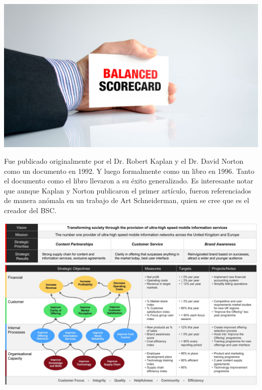 \begin{center}
\includegraphics[width=15cm]{./Imagenes/img3}
\end{center}

\item{Fue publicado originalmente por el Dr. Robert Kaplan y el Dr. David Norton como un documento en 1992. Y luego formalmente como un libro en 1996. Tanto el documento como el libro llevaron a su éxito generalizado. Es interesante notar que aunque Kaplan y Norton publicaron el primer artículo, fueron referenciados de manera anómala en un trabajo de Art Schneiderman, quien se cree que es el creador del BSC.}

\begin{center}
\includegraphics[width=17cm]{./Imagenes/img10}
\end{center}


